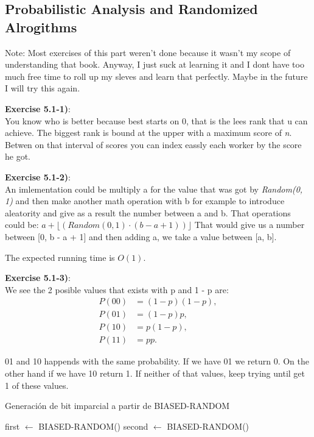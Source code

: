 \documentclass{article}
\newcounter{exercise}[section]   %
\begin{document}
\subsection{Probabilistic Analysis and Randomized Alrogithms}


\setcounter{exercise}{0}
Note: Most exercises of this part weren't done because it wasn't my scope of understanding
that book. Anyway, I just suck at learning it and I dont have too much free time to
roll up my sleves and learn that perfectly. Maybe in the future I will try this again.

\textbf{Exercise 5.1-1)}:\\
You know who is better because best starts on 0, that is the lees rank that u can achieve.
The biggest rank is bound at the upper with a maximum score of \textit{n}. Betwen on that 
interval of scores you can index eassly each worker by the score he got. 

\textbf{Exercise 5.1-2)}:\\
An imlementation could be multiply a for the value that was got by \textit{Random(0, 1)}
and then make another math operation with b for example to introduce aleatority and give
as a result the number between a and b. That operations could be:
\(a + \lfloor(Random(0, 1) \cdot (b - a + 1))\rfloor\) That would give us a number between
[0, b - a + 1] and then adding a, we take a value between [a, b].

The expected running time is \(O(1)\).

\textbf{Exercise 5.1-3)}:\\
We see the 2 posible values that exists with p and 1 - p are:
\begin{align*}
    P(00) &= (1 - p)(1 - p), \\
    P(01) &= (1 - p)p, \\
    P(10) &= p(1 - p), \\
    P(11) &= p p.
\end{align*}

01 and 10 happends with the same probability. If we have 01 we return 0. On the other hand
if we have 10 return 1. If neither of that values, keep trying until get 1 of these values.

\newpage
\begin{algorithm}
\caption{Generación de bit imparcial a partir de BIASED-RANDOM}
\begin{algorithmic}
            \State first $\gets$ BIASED-RANDOM()
            \State second $\gets$ BIASED-RANDOM()
            
                \State {}
                \State {}
            \EndIf
        \EndWhile
    \EndProcedure
\end{algorithmic}
\end{algorithm}
\end{document}
